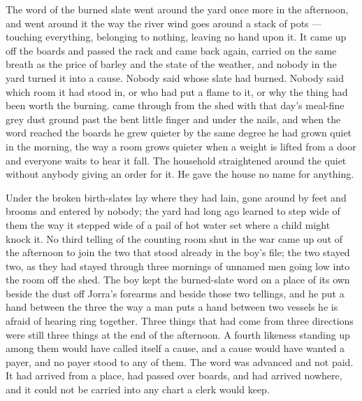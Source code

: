 \scenebreak

The word of the burned slate went around the yard once more in the afternoon, and went around it the way the river wind goes around a stack of pots --- touching everything, belonging to nothing, leaving no hand upon it. It came up off the boards and passed the rack and came back again, carried on the same breath as the price of barley and the state of the weather, and nobody in the yard turned it into a cause. Nobody said whose slate had burned. Nobody said which room it had stood in, or who had put a flame to it, or why the thing had been worth the burning.  came through from the shed with that day's meal-fine grey dust ground past the bent little finger and under the nails, and when the word reached the boards he grew quieter by the same degree he had grown quiet in the morning, the way a room grows quieter when a weight is lifted from a door and everyone waits to hear it fall. The household straightened around the quiet without anybody giving an order for it. He gave the house no name for anything.

Under  the broken birth-slates lay where they had lain, gone around by feet and brooms and entered by nobody; the yard had long ago learned to step wide of them the way it stepped wide of a pail of hot water set where a child might knock it. No third telling of the counting room shut in the war came up out of the afternoon to join the two that stood already in the boy's file; the two stayed two, as they had stayed through three mornings of unnamed men going low into the room off the shed. The boy kept the burned-slate word on a place of its own beside the dust off Jorra's forearms and beside those two tellings, and he put a hand between the three the way a man puts a hand between two vessels he is afraid of hearing ring together. Three things that had come from three directions were still three things at the end of the afternoon. A fourth likeness standing up among them would have called itself a cause, and a cause would have wanted a payer, and no payer stood to any of them. The word was advanced and not paid. It had arrived from a place, had passed over boards, and had arrived nowhere, and it could not be carried into any chart a clerk would keep.

\scenebreak

